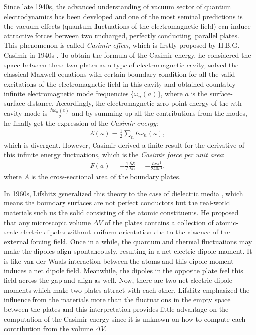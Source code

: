 Since late 1940s, the advanced understanding of vacuum sector of quantum electrodynamics has been developed and one of the most seminal predictions is
the vacuum effects (quantum fluctuations of the electromagnetic field) can induce attractive forces between two uncharged, perfectly conducting, parallel 
plates. This phenomenon is called \emph{Casimir effect}, which is firstly proposed by H.B.G. Casimir in 1940s \cite{casimir1948attraction}. To obtain the formula 
of the Casimir energy, he considered the space between these two plates as a type of electromagnetic cavity, solved the classical Maxwell equations with 
certain boundary condition for all the valid excitations of the electromagnetic field in this cavity and obtained countably infinite electromagnetic mode 
frequencies $\{\omega_{n}(a)\}$, where $a$ is the surface-surface distance. Accordingly, the electromagnetic zero-point energy of the $n$th cavity mode is 
$\frac{\hbar\omega_{n}(a)}{2}$ and by summing up all the contributions from the modes, he finally get the expression of the \emph{Casimir energy}:
\begin{align*}
    \mathcal{E}(a) = \frac{1}{2}\sum_{n}\hbar\omega_{n}(a),
\end{align*}
which is divergent. However, Casimir derived a finite result for the derivative of this infinite energy fluctuations, 
which is the \emph{Casimir force per unit area}:
\begin{align*}
    F(a) = -\frac{1}{A}\frac{\partial\mathcal{E}}{\partial a} = -\frac{\hbar c\pi^{2}}{240a^{4}},
\end{align*}
where $A$ is the cross-sectional area of the boundary plates. 

In 1960s, Lifshitz generalized this theory to the case of dielectric media \cite{dzyaloshinskii1961general}, which means the boundary surfaces are not perfect conductors but the real-world
materials such us the solid consisting of the atomic constituents. He proposed that any microscopic volume $\Delta V$ of the plates contains a collection of 
atomic-scale electric dipoles without uniform orientation due to the absence of the external forcing field. Once in a while, the quantum and thermal 
fluctuations may make the dipoles align spontaneously, resulting in a net electric dipole moment. It is like van der Waals interaction between the 
atoms and this dipole moment induces a net dipole field. Meanwhile, the dipoles in the opposite plate feel this field
across the gap and align as well. Now, there are two net electric dipole moments which make two plates attract with each other. Lifshitz emphasized the 
influence from the materials more than the fluctuations in the empty space between the plates and this interpretation provides little advantage on the 
computation of the Casimir energy since it is unknown on how to compute each contribution from the volume $\Delta V$. 

